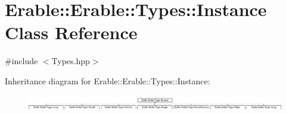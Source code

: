 \hypertarget{class_erable_1_1_erable_1_1_types_1_1_instance}{}\section{Erable\+::Erable\+::Types\+::Instance Class Reference}
\label{class_erable_1_1_erable_1_1_types_1_1_instance}


{\ttfamily \#include $<$Types.\+hpp$>$}

Inheritance diagram for Erable\+::Erable\+::Types\+::Instance\+:\begin{figure}[H]
\begin{center}
\leavevmode
\includegraphics[height=0.692641cm]{class_erable_1_1_erable_1_1_types_1_1_instance}
\end{center}
\end{figure}
